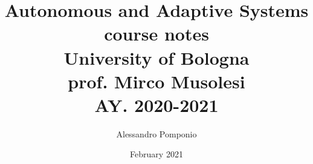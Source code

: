 \usepackage[utf8]{inputenc}
\usepackage{amsmath}
\usepackage{amssymb}
\usepackage{parskip}                    %
\usepackage{verbatim}
\usepackage{graphicx}
\usepackage{hyperref}                   %
\usepackage{wrapfig}                    %
\usepackage{afterpage}                  %
\usepackage{bbm}                        %
\usepackage{bm}                         %
\usepackage{caption}                    %
\usepackage{subfigure}                 %
\usepackage[
    backend=biber,
    style=alphabetic,
    sorting=ynt
]{biblatex}

\usepackage[ruled,vlined]{algorithm2e}

\newcommand\addemptypage{       %
    \null
    \thispagestyle{empty}
    \addtocounter{page}{-1}
    \newpage
    }

\newcommand{\source}[1]{\vspace{-5pt} \caption*{ Source: {#1}} }

\DeclareMathOperator*{\argmax}{argmax}



\graphicspath{ {./Images/} }

\title{Autonomous and Adaptive Systems \\
        course notes\\
        University of Bologna \\
        \large	 prof. Mirco Musolesi \\
        AY. 2020-2021}
\author{Alessandro Pomponio}
\date{February 2021}



\maketitle
\clearpage
\addemptypage


